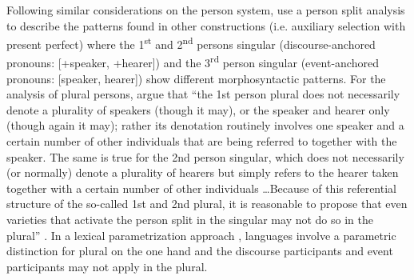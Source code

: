 \documentclass[output=paper]{langsci/langscibook}
\begin{document}
Following similar considerations on the person system, \citet{Manzini2007,Manzini2011Bio} use a person split analysis to describe the patterns found in other constructions (i.e. auxiliary selection with present perfect) where the 1\textsuperscript{st} and 2\textsuperscript{nd} persons singular (discourse-anchored pronouns: [+speaker, +hearer]) and the 3\textsuperscript{rd} person singular (event-anchored pronouns: [\textminus{}speaker, \textminus{}hearer]) show different morphosyntactic patterns. For the analysis of plural persons, \citet{Manzini2011Bio} argue that “the 1st person plural does not necessarily denote a plurality of speakers (though it may), or the speaker and hearer only (though again it may); rather its denotation routinely involves one speaker and a certain number of other individuals that are being referred to together with the speaker. The same is true for the 2nd person singular, which does not necessarily (or normally) denote a plurality of hearers but simply refers to the hearer taken together with a certain number of other individuals …Because of this referential structure of the so-called 1st and 2nd plural, it is reasonable to propose that even varieties that activate the person split in the singular may not do so in the plural” \citep[213]{Manzini2011Bio}. In a lexical parametrization approach \citep{Manzini1987,Manzini2011Bio}, languages involve a parametric distinction for plural on the one hand and the discourse participants and event participants may not apply in the plural. 
\end{document}
